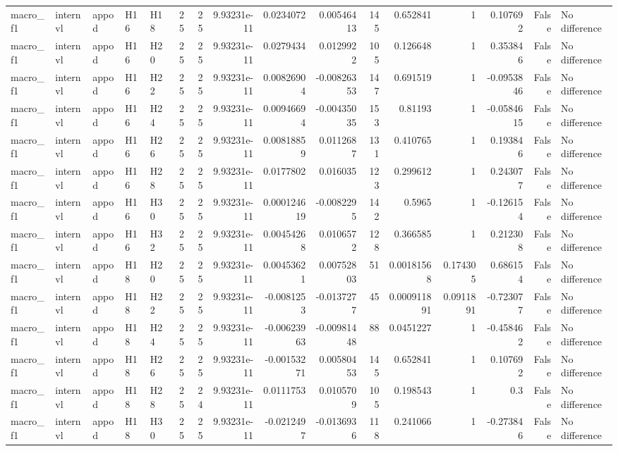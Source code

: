 \begin{longtable}{lllllrrrrrrrrrrl}
macro\_f1 & internvl & appod & H16 & H18 & 25 & 25 & 9.93231e-11 & 0.0234072 & 0.00546413 & 145 & 0.652841 & 1 & 0.107692 & False & No difference \\
macro\_f1 & internvl & appod & H16 & H20 & 25 & 25 & 9.93231e-11 & 0.0279434 & 0.0129922 & 105 & 0.126648 & 1 & 0.353846 & False & No difference \\
macro\_f1 & internvl & appod & H16 & H22 & 25 & 25 & 9.93231e-11 & 0.00826904 & -0.00826353 & 147 & 0.691519 & 1 & -0.0953846 & False & No difference \\
macro\_f1 & internvl & appod & H16 & H24 & 25 & 25 & 9.93231e-11 & 0.00946694 & -0.00435035 & 153 & 0.81193 & 1 & -0.0584615 & False & No difference \\
macro\_f1 & internvl & appod & H16 & H26 & 25 & 25 & 9.93231e-11 & 0.00818859 & 0.0112687 & 131 & 0.410765 & 1 & 0.193846 & False & No difference \\
macro\_f1 & internvl & appod & H16 & H28 & 25 & 25 & 9.93231e-11 & 0.0177802 & 0.016035 & 123 & 0.299612 & 1 & 0.243077 & False & No difference \\
macro\_f1 & internvl & appod & H16 & H30 & 25 & 25 & 9.93231e-11 & 0.000124619 & -0.0082295 & 142 & 0.5965 & 1 & -0.126154 & False & No difference \\
macro\_f1 & internvl & appod & H16 & H32 & 25 & 25 & 9.93231e-11 & 0.00454268 & 0.0106572 & 128 & 0.366585 & 1 & 0.212308 & False & No difference \\
macro\_f1 & internvl & appod & H18 & H20 & 25 & 25 & 9.93231e-11 & 0.00453621 & 0.00752803 & 51 & 0.00181568 & 0.174305 & 0.686154 & False & No difference \\
macro\_f1 & internvl & appod & H18 & H22 & 25 & 25 & 9.93231e-11 & -0.0081253 & -0.0137277 & 45 & 0.000911891 & 0.0911891 & -0.723077 & False & No difference \\
macro\_f1 & internvl & appod & H18 & H24 & 25 & 25 & 9.93231e-11 & -0.00623963 & -0.00981448 & 88 & 0.0451227 & 1 & -0.458462 & False & No difference \\
macro\_f1 & internvl & appod & H18 & H26 & 25 & 25 & 9.93231e-11 & -0.00153271 & 0.00580453 & 145 & 0.652841 & 1 & 0.107692 & False & No difference \\
macro\_f1 & internvl & appod & H18 & H28 & 25 & 24 & 9.93231e-11 & 0.0111753 & 0.0105709 & 105 & 0.198543 & 1 & 0.3 & False & No difference \\
macro\_f1 & internvl & appod & H18 & H30 & 25 & 25 & 9.93231e-11 & -0.0212497 & -0.0136936 & 118 & 0.241066 & 1 & -0.273846 & False & No difference \\

\end{longtable}
